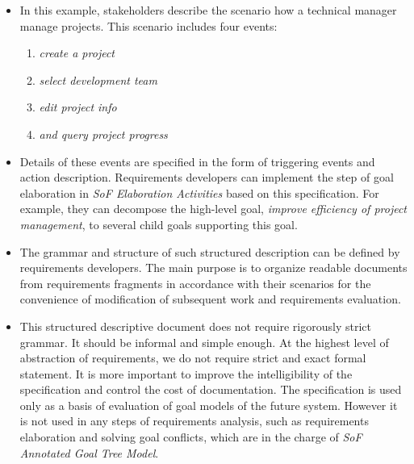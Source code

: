 ﻿\documentclass{beamer}
\begin{document}
\begin{frame}     %
  \footnotesize{
    \begin{itemize}
    \item
      In this example, stakeholders describe the scenario how a technical manager manage projects.
      This scenario includes four events:
      \begin{enumerate}
      \item \emph{create a project}
      \item \emph{select development team}
      \item \emph{edit project info}
      \item \emph{and query project progress}
      \end{enumerate}
    \item 
      Details of these events are specified in the form of triggering events and action description.
      Requirements developers can implement the step of goal elaboration in \emph{SoF Elaboration Activities} based on this specification.
      For example, they can decompose the high-level goal, \emph{improve efficiency of project management}, to several child goals supporting this goal.\pause
    \end{itemize}
  }
\end{frame}
\begin{frame}     %
  \footnotesize{
    \begin{itemize}
    \item 
      The grammar and structure of such structured description can be defined by requirements developers. The main purpose is to organize readable documents from requirements fragments in accordance with their scenarios for the convenience of modification of subsequent work and requirements evaluation.\pause
    \item
      This structured descriptive document does not require rigorously strict grammar.
      It should be informal and simple enough.
      At the highest level of abstraction of requirements, we do not require strict and exact formal statement.
      It is more important to improve the intelligibility of the specification and control the cost of documentation.
      The specification is used only as a basis of evaluation of goal models of the future system.
      However it is not used in any steps of requirements analysis, such as requirements elaboration and solving goal conflicts, which are in the charge of \emph{SoF Annotated Goal Tree Model}.\pause
    \end{itemize}
  }
\end{frame}
\end{document}
